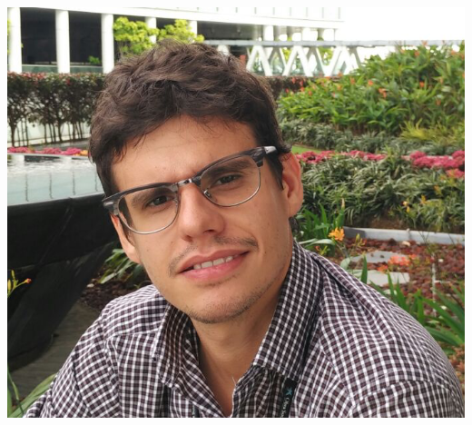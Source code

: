 \documentclass[paper=a4,fontsize=11pt]{temp} %
\begin{document}
\sepspace
\begin{minipage}{.15\linewidth}
   \includegraphics[width=\textwidth]{fotoCV4}
\end{minipage}      
\end{document}
